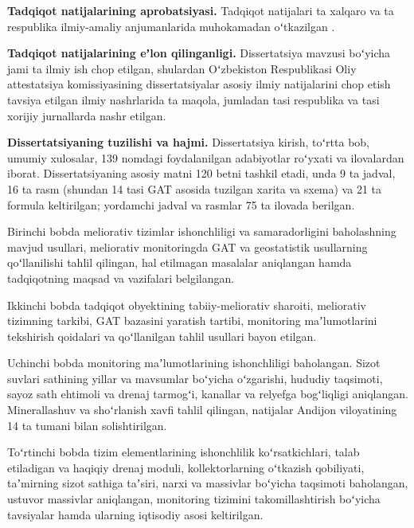 \textbf{Tadqiqot natijalarining aprobatsiyasi.} Tadqiqot natijalari
\toldir{{[}soni{]}} ta xalqaro va \toldir{{[}soni{]}} ta respublika
ilmiy-amaliy anjumanlarida muhokamadan oʻtkazilgan
\toldir{{[}anjumanlar}   
 \toldir{kiritiladi{]}}.

\textbf{Tadqiqot natijalarining eʼlon qilinganligi.} Dissertatsiya
mavzusi boʻyicha jami \toldir{{[}soni{]}} ta ilmiy ish chop etilgan,
shulardan Oʻzbekiston Respublikasi Oliy attestatsiya komissiyasining
dissertatsiyalar asosiy ilmiy natijalarini chop etish tavsiya etilgan
ilmiy nashrlarida \toldir{{[}soni{]}} ta maqola, jumladan
\toldir{{[}soni{]}} tasi respublika va \toldir{{[}soni{]}} tasi xorijiy
jurnallarda nashr etilgan.

\textbf{Dissertatsiyaning tuzilishi va hajmi.} Dissertatsiya kirish,
toʻrtta bob, umumiy xulosalar, 139 nomdagi foydalanilgan adabiyotlar
roʻyxati va ilovalardan iborat. Dissertatsiyaning asosiy matni 120 betni
tashkil etadi, unda 9 ta jadval, 16 ta rasm (shundan 14 tasi GAT asosida
tuzilgan xarita va sxema) va 21 ta formula keltirilgan; yordamchi jadval
va rasmlar 75 ta ilovada berilgan.

Birinchi bobda meliorativ tizimlar ishonchliligi va samaradorligini
baholashning mavjud usullari, meliorativ monitoringda GAT va
geostatistik usullarning qoʻllanilishi tahlil qilingan, hal etilmagan
masalalar aniqlangan hamda tadqiqotning maqsad va vazifalari
belgilangan.

Ikkinchi bobda tadqiqot obyektining tabiiy-meliorativ sharoiti,
meliorativ tizimning tarkibi, GAT bazasini yaratish tartibi, monitoring
maʼlumotlarini tekshirish qoidalari va qoʻllanilgan tahlil usullari
bayon etilgan.

Uchinchi bobda monitoring maʼlumotlarining ishonchliligi baholangan.
Sizot suvlari sathining yillar va mavsumlar boʻyicha oʻzgarishi, hududiy
taqsimoti, sayoz sath ehtimoli va drenaj tarmogʻi, kanallar va relyefga
bogʻliqligi aniqlangan. Minerallashuv va shoʻrlanish xavfi tahlil
qilingan, natijalar Andijon viloyatining 14 ta tumani bilan
solishtirilgan.

Toʻrtinchi bobda tizim elementlarining ishonchlilik koʻrsatkichlari,
talab etiladigan va haqiqiy drenaj moduli, kollektorlarning oʻtkazish
qobiliyati, taʼmirning sizot sathiga taʼsiri, narxi va massivlar
boʻyicha taqsimoti baholangan, ustuvor massivlar aniqlangan, monitoring
tizimini takomillashtirish boʻyicha tavsiyalar hamda ularning iqtisodiy
asosi keltirilgan.

